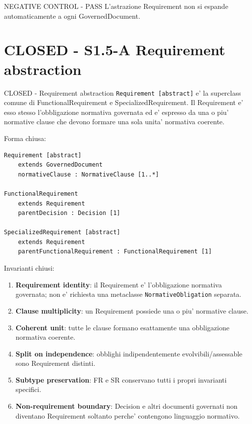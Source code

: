 \documentclass[11pt,a4paper]{article}
\begin{document}
\begin{resultbox}{NEGATIVE CONTROL - PASS}
L'astrazione Requirement non si espande automaticamente a ogni GovernedDocument.
\end{resultbox}

\section{CLOSED - S1.5-A Requirement abstraction}

\begin{resultbox}{CLOSED - Requirement abstraction}
\texttt{Requirement [abstract]} e' la superclass comune di FunctionalRequirement e SpecializedRequirement. Il Requirement e' esso stesso l'obbligazione normativa governata ed e' espresso da una o piu' normative clause che devono formare una sola unita' normativa coerente.
\end{resultbox}

Forma chiusa:

\begin{lstlisting}
Requirement [abstract]
    extends GovernedDocument
    normativeClause : NormativeClause [1..*]

FunctionalRequirement
    extends Requirement
    parentDecision : Decision [1]

SpecializedRequirement [abstract]
    extends Requirement
    parentFunctionalRequirement : FunctionalRequirement [1]
\end{lstlisting}

Invarianti chiusi:
\begin{enumerate}
  \item \textbf{Requirement identity}: il Requirement e' l'obbligazione normativa governata; non e' richiesta una metaclasse \texttt{NormativeObligation} separata.
  \item \textbf{Clause multiplicity}: un Requirement possiede una o piu' normative clause.
  \item \textbf{Coherent unit}: tutte le clause formano esattamente una obbligazione normativa coerente.
  \item \textbf{Split on independence}: obblighi indipendentemente evolvibili/assessable sono Requirement distinti.
  \item \textbf{Subtype preservation}: FR e SR conservano tutti i propri invarianti specifici.
  \item \textbf{Non-requirement boundary}: Decision e altri documenti governati non diventano Requirement soltanto perche' contengono linguaggio normativo.
\end{enumerate}
\end{document}

